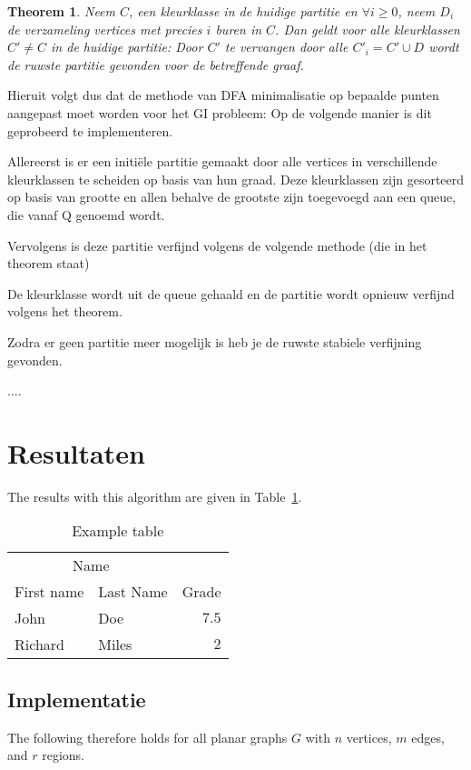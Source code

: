 \documentclass[twoside]{article}
\newtheorem{theorem}{Theorem}[section]
\begin{document}
\begin{multicols}{2}
\begin{theorem}
Neem $C$, een kleurklasse in de huidige partitie en $\forall i \geq 0$, neem $D_{i}$ de verzameling vertices met precies
$i$ buren in $C$. Dan geldt voor alle kleurklassen $C' \neq C$ in de huidige partitie:
Door $C'$ te vervangen door alle $C'_{i} = C' \cup D$ wordt de ruwste partitie gevonden voor de betreffende graaf.
\end{theorem}

Hieruit volgt dus dat de methode van DFA minimalisatie op bepaalde punten aangepast moet worden voor het GI probleem:
Op de volgende manier is dit geprobeerd te implementeren.

Allereerst is er een initi\"ele partitie gemaakt door alle vertices in verschillende kleurklassen te scheiden op basis
van hun graad. Deze kleurklassen zijn gesorteerd op basis van grootte en allen behalve de grootste zijn toegevoegd aan een queue, die vanaf Q genoemd wordt.

Vervolgens is deze partitie verfijnd volgens de volgende methode (die in het theorem staat)

De kleurklasse wordt uit de queue gehaald en de partitie wordt opnieuw verfijnd volgens het theorem.

Zodra er geen partitie meer mogelijk is heb je de ruwste stabiele verfijning gevonden.

....


\section{Resultaten}

The results with this algorithm are given in Table~\ref{table:example}.
\begin{table}[H]
\caption{Example table}\label{table:example}
\centering
\begin{tabular}{llr}
\toprule
\multicolumn{2}{c}{Name} \\
\cmidrule(r){1-2}
First name & Last Name & Grade \\
\midrule
John & Doe & $7.5$ \\
Richard & Miles & $2$ \\
\bottomrule
\end{tabular}
\end{table}


\lipsum[5] %

\subsection{Implementatie}
\lipsum[1]
The following therefore holds for all
planar graphs $G$ with $n$ vertices, $m$ edges, and $r$ regions.


\end{multicols}
\end{document}
